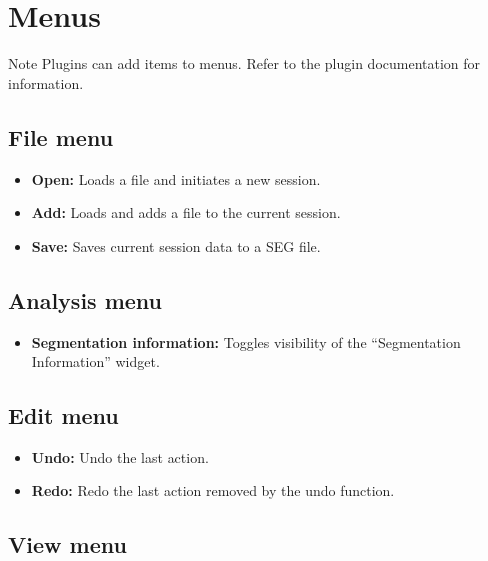 \section{Menus}

\begin{bclogo}[couleur = yellow!33, logo=\bcattention]
{Note} Plugins can add items to menus. Refer to the plugin documentation for information.
\end{bclogo}

\subsection{File menu}

\begin{itemize}
\item \textbf{Open:} Loads a file and initiates a new \espina{} session.
\item \textbf{Add:} Loads and adds a file to the current session.
\item \textbf{Save:} Saves current session data to a SEG file.
\end{itemize}

\subsection{Analysis menu}

\begin{itemize}
\item \textbf{Segmentation information:} Toggles visibility of the ``Segmentation Information'' widget.
\end{itemize}

\subsection{Edit menu}

\begin{itemize}
\item \textbf{Undo:} Undo the last action.
\item \textbf{Redo:} Redo the last action removed by the undo function.
\end{itemize}

\subsection{View menu}

